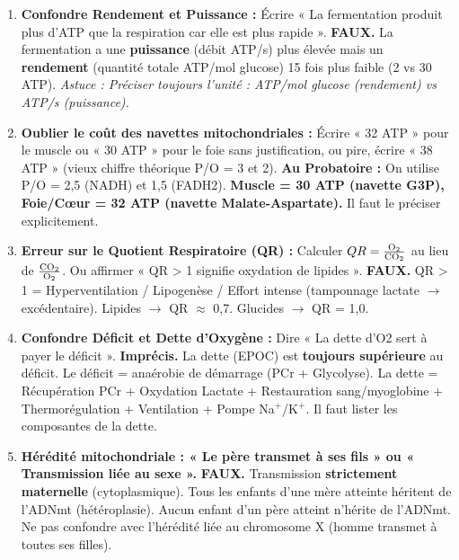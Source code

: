 \documentclass[11pt]{article}
\begin{document}
\begin{attention}
    \begin{enumerate}
        \item \textbf{Confondre Rendement et Puissance :} Écrire « La fermentation produit plus d'ATP que la respiration car elle est plus rapide ». \textbf{FAUX.} La fermentation a une \textbf{puissance} (débit ATP/s) plus élevée mais un \textbf{rendement} (quantité totale ATP/mol glucose) 15 fois plus faible (2 vs 30 ATP). \emph{Astuce : Préciser toujours l'unité : ATP/mol glucose (rendement) vs ATP/s (puissance).}
        \item \textbf{Oublier le coût des navettes mitochondriales :} Écrire « 32 ATP » pour le muscle ou « 30 ATP » pour le foie sans justification, ou pire, écrire « 38 ATP » (vieux chiffre théorique P/O = 3 et 2). \textbf{Au Probatoire :} On utilise P/O = 2,5 (NADH) et 1,5 (FADH2). \textbf{Muscle = 30 ATP (navette G3P), Foie/Cœur = 32 ATP (navette Malate-Aspartate).} Il faut le préciser explicitement.
        \item \textbf{Erreur sur le Quotient Respiratoire (QR) :} Calculer $QR = \frac{\ce{O2}}{\ce{CO2}}$ au lieu de $\frac{\ce{CO2}}{\ce{O2}}$. Ou affirmer « QR > 1 signifie oxydation de lipides ». \textbf{FAUX.} QR > 1 = Hyperventilation / Lipogenèse / Effort intense (tamponnage lactate $\to$  excédentaire). Lipides $\to$ QR $\approx$ 0,7. Glucides $\to$ QR = 1,0.
        \item \textbf{Confondre Déficit et Dette d'Oxygène :} Dire « La dette d'O2 sert à payer le déficit ». \textbf{Imprécis.} La dette (EPOC) est \textbf{toujours supérieure} au déficit. Le déficit = anaérobie de démarrage (PCr + Glycolyse). La dette = Récupération PCr + Oxydation Lactate + Restauration  sang/myoglobine + Thermorégulation + Ventilation + Pompe Na$^+$/K$^+$. Il faut lister les composantes de la dette.
        \item \textbf{Hérédité mitochondriale : « Le père transmet à ses fils » ou « Transmission liée au sexe ».} \textbf{FAUX.} Transmission \textbf{strictement maternelle} (cytoplasmique). Tous les enfants d'une mère atteinte héritent de l'ADNmt (hétéroplasie). Aucun enfant d'un père atteint n'hérite de l'ADNmt. Ne pas confondre avec l'hérédité liée au chromosome X (homme transmet à toutes ses filles).
    \end{enumerate}
\end{attention}
\end{document}
